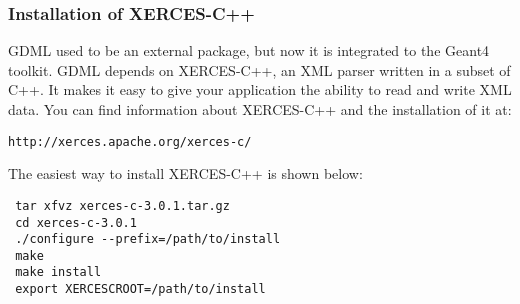  
 


 
  



\subsubsection{Installation of XERCES-C++}
GDML used to be an external package, but now it is integrated to the Geant4 toolkit. GDML depends on XERCES-C++, an XML parser written in a subset of C++. It makes it easy to give your application the ability to read and write XML data. You can find information about XERCES-C++ and the installation of it at:
\begin{lstlisting}
http://xerces.apache.org/xerces-c/
\end{lstlisting}

The easiest way to install XERCES-C++ is shown below:
\begin{lstlisting}
 tar xfvz xerces-c-3.0.1.tar.gz
 cd xerces-c-3.0.1
 ./configure --prefix=/path/to/install
 make
 make install
 export XERCESCROOT=/path/to/install
\end{lstlisting}

